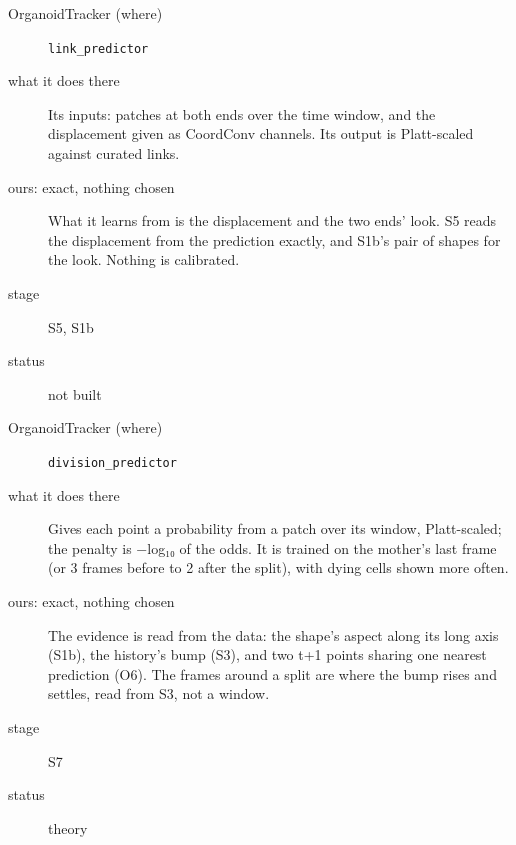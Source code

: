 \begin{description}
\item[{OrganoidTracker (where)}] \texttt{link\_\allowbreak{}predictor}
\item[{what it does there}] Its inputs: patches at both ends over the time window, and the displacement given as CoordConv channels. Its output is Platt-scaled against curated links.
\item[{ours: exact, nothing chosen}] What it learns from is the displacement and the two ends' look. S5 reads the displacement from the prediction exactly, and S1b's pair of shapes for the look. Nothing is calibrated.
\item[{stage}] S5, S1b
\item[{status}] not built
\end{description}

\begin{description}
\item[{OrganoidTracker (where)}] \texttt{division\_\allowbreak{}predictor}
\item[{what it does there}] Gives each point a probability from a patch over its window, Platt-scaled; the penalty is −log₁₀ of the odds. It is trained on the mother's last frame (or 3 frames before to 2 after the split), with dying cells shown more often.
\item[{ours: exact, nothing chosen}] The evidence is read from the data: the shape's aspect along its long axis (S1b), the history's bump (S3), and two t+1 points sharing one nearest prediction (O6). The frames around a split are where the bump rises and settles, read from S3, not a window.
\item[{stage}] S7
\item[{status}] theory
\end{description}

